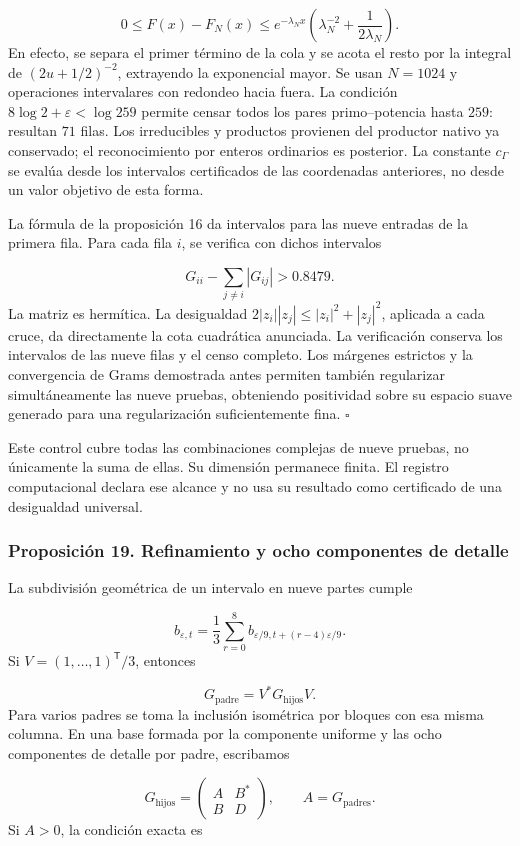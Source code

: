 \[
0\leq F(x)-F_N(x)
\leq e^{-\lambda_Nx}
\left(\lambda_N^{-2}+\frac1{2\lambda_N}\right).
\]
En efecto, se separa el primer término de la cola y se acota el resto por la integral de \((2u+1/2)^{-2}\), extrayendo la exponencial mayor. Se usan \(N=1024\) y operaciones intervalares con redondeo hacia fuera. La condición \(8\log2+\varepsilon<\log259\) permite censar todos los pares primo–potencia hasta \(259\): resultan \(71\) filas. Los irreducibles y productos provienen del productor nativo ya conservado; el reconocimiento por enteros ordinarios es posterior. La constante \(c_\Gamma\) se evalúa desde los intervalos certificados de las coordenadas anteriores, no desde un valor objetivo de esta forma.

La fórmula de la proposición 16 da intervalos para las nueve entradas de la primera fila. Para cada fila \(i\), se verifica con dichos intervalos

\[
G_{ii}-\sum_{j\neq i}|G_{ij}|>0.8479.
\]
La matriz es hermítica. La desigualdad \(2|z_i||z_j|\leq|z_i|^2+|z_j|^2\), aplicada a cada cruce, da directamente la cota cuadrática anunciada. La verificación conserva los intervalos de las nueve filas y el censo completo. Los márgenes estrictos y la convergencia de Grams demostrada antes permiten también regularizar simultáneamente las nueve pruebas, obteniendo positividad sobre su espacio suave generado para una regularización suficientemente fina. \hfill\(\square\)

Este control cubre todas las combinaciones complejas de nueve pruebas, no únicamente la suma de ellas. Su dimensión permanece finita. El registro computacional declara ese alcance y no usa su resultado como certificado de una desigualdad universal.

\subsubsection*{Proposición 19. Refinamiento y ocho componentes de detalle}
La subdivisión geométrica de un intervalo en nueve partes cumple

\[
b_{\varepsilon,t}=\frac13\sum_{r=0}^8
b_{\varepsilon/9,t+(r-4)\varepsilon/9}.
\]
Si \(V=(1,\ldots,1)^{\mathsf T}/3\), entonces

\[
G_{\mathrm{padre}}=V^*G_{\mathrm{hijos}}V.
\]
Para varios padres se toma la inclusión isométrica por bloques con esa misma columna. En una base formada por la componente uniforme y las ocho componentes de detalle por padre, escribamos

\[
G_{\mathrm{hijos}}=
\begin{pmatrix}A&B^*\\B&D\end{pmatrix},\qquad
A=G_{\mathrm{padres}}.
\]
Si \(A>0\), la condición exacta es

